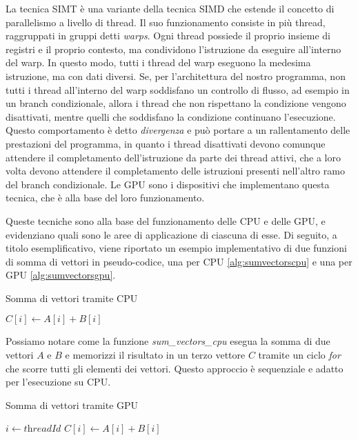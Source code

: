 La tecnica SIMT è una variante della tecnica SIMD che estende il concetto di parallelismo
a livello di thread. Il suo funzionamento consiste in più thread, raggruppati in
gruppi detti \textit{warps}. Ogni thread possiede il proprio insieme di registri
e il proprio contesto, ma condividono l'istruzione da eseguire all'interno del
warp. In questo modo, tutti i thread del warp eseguono la medesima istruzione, ma
con dati diversi. Se, per l'architettura del nostro programma, non tutti i
thread all'interno del warp soddisfano un controllo di flusso, ad esempio in un branch
condizionale, allora i thread che non rispettano la condizione vengono
disattivati, mentre quelli che soddisfano la condizione continuano l'esecuzione.
Questo comportamento è detto \textit{divergenza} e può portare a un rallentamento
delle prestazioni del programma, in quanto i thread disattivati devono comunque
attendere il completamento dell'istruzione da parte dei thread attivi, che a loro
volta devono attendere il completamento delle istruzioni presenti nell'altro ramo
del branch condizionale. Le GPU sono i dispositivi che implementano questa
tecnica, che è alla base del loro funzionamento.

\vspace{1em}

Queste tecniche sono alla base del funzionamento delle CPU e delle GPU, e evidenziano
quali sono le aree di applicazione di ciascuna di esse. Di seguito, a titolo esemplificativo,
viene riportato un esempio implementativo di due funzioni di somma di vettori in
pseudo-codice, una per CPU \ref{alg:sumvectorscpu} e una per GPU \ref{alg:sumvectorsgpu}.

\begin{algorithm}
  \caption{Somma di vettori tramite CPU}
  \label{alg:sumvectorscpu}
  \begin{algorithmic}
      \State
    $C[i] \gets A[i] + B[i]$ \EndFor \EndFunction
  \end{algorithmic}
\end{algorithm}

Possiamo notare come la funzione \textit{sum\_vectors\_cpu} esegua la somma di due
vettori $A$ e $B$ e memorizzi il risultato in un terzo vettore $C$ tramite un ciclo
\textit{for} che scorre tutti gli elementi dei vettori. Questo approccio è sequenziale
e adatto per l'esecuzione su CPU.

\begin{algorithm}
  \caption{Somma di vettori tramite GPU}
  \label{alg:sumvectorsgpu}
  \begin{algorithmic}
     \State $i \gets \textit{threadId}$ \State
    $C[i] \gets A[i] + B[i]$ \EndFunction
  \end{algorithmic}
\end{algorithm}

